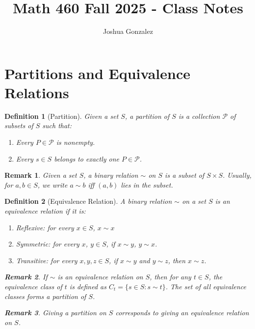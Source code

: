 \documentclass[12pt]{article}
\title{Math 460 Fall 2025 - Class Notes}
\author{Joshua Gonzalez}
\date{}
\newtheorem{definition}{Definition}[section]
\newtheorem{remark}{Remark}[section]
\begin{document}
\maketitle

\section{Partitions and Equivalence Relations}

\begin{definition}[Partition]
Given a set $S$, a \emph{partition} of $S$ is a collection $\mathcal{P}$ of subsets of $S$ such that:
\begin{enumerate}
    \item Every $P \in \mathcal{P}$ is nonempty.
    \item Every $s \in S$ belongs to exactly one $P \in \mathcal{P}$.
\end{enumerate}
\end{definition}
\begin{remark}
    Given a set $S$, a binary relation $\sim$ on $S$ is a subset of $S \times S$. Usually, for $a, b \in S$, we write $a \sim b$ iff $(a,b)$ lies in the subset. 
\end{remark}

\begin{definition}[Equivalence Relation]
A binary relation $\sim$ on a set $S$ is an \emph{equivalence relation} if it is:
\begin{enumerate}
    \item Reflexive: for every $x \in S$, $x \sim x$
    \item Symmetric: for every $x$, $y \in S$, if $x \sim y$, $y \sim x$.
    \item Transitive: for every $x, y, z \in S$, if $x \sim y$ and $y \sim z$, then $x \sim z$.
\end{enumerate}

\begin{remark}
    If $\sim$ is an equivalence relation on $S$, then for any $t \in S$, the \emph{equivalence class} of $t$ is defined as $C_t = \{ s \in S : s \sim t \}$. The set of all equivalence classes forms a partition of $S$.
\end{remark}

\begin{remark}
    Giving a partition on $S$ corresponds to giving an equivalence relation on $S$.
\end{remark}
\end{definition}
\end{document}
